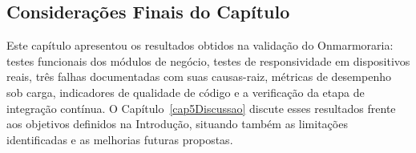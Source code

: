 \subsection*{Considerações Finais do Capítulo}

Este capítulo apresentou os resultados obtidos na validação do Onmarmoraria: testes funcionais dos módulos de negócio, testes de responsividade em dispositivos reais, três falhas documentadas com suas causas-raiz, métricas de desempenho sob carga, indicadores de qualidade de código e a verificação da etapa de integração contínua. O Capítulo~\ref{cap5Discussao} discute esses resultados frente aos objetivos definidos na Introdução, situando também as limitações identificadas e as melhorias futuras propostas.
